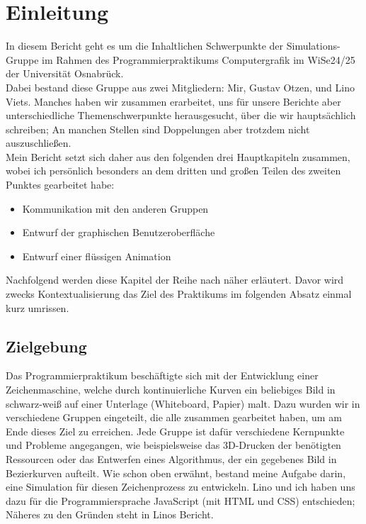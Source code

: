 \section{Einleitung}
\label{src:einleitung}
In diesem Bericht geht es um die Inhaltlichen Schwerpunkte der \glqq{}Simulations-Gruppe\grqq{} im Rahmen des Programmierpraktikums Computergrafik im WiSe24/25 der Universität Osnabrück. \\
Dabei bestand diese Gruppe aus zwei Mitgliedern: Mir, Gustav Otzen, und Lino Viets. Manches haben wir zusammen erarbeitet, uns für unsere Berichte aber unterschiedliche Themenschwerpunkte herausgesucht, über die wir hauptsächlich schreiben; An manchen Stellen sind Doppelungen aber trotzdem nicht auszuschließen. \\
Mein Bericht setzt sich daher aus den folgenden drei Hauptkapiteln zusammen, wobei ich persönlich besonders an dem dritten und großen Teilen des zweiten Punktes gearbeitet habe:

\begin{itemize}
\item Kommunikation mit den anderen Gruppen
\item Entwurf der graphischen Benutzeroberfläche
\item Entwurf einer flüssigen Animation
\end{itemize}

Nachfolgend werden diese Kapitel der Reihe nach näher erläutert. Davor wird zwecks Kontextualisierung das Ziel des Praktikums im folgenden Absatz einmal kurz umrissen.

\subsection{Zielgebung}
Das Programmierpraktikum beschäftigte sich mit der Entwicklung einer Zeichenmaschine, welche durch kontinuierliche Kurven ein beliebiges Bild in schwarz-weiß auf einer Unterlage (Whiteboard, Papier) malt. Dazu wurden wir in verschiedene Gruppen eingeteilt, die alle zusammen gearbeitet haben, um am Ende dieses Ziel  zu erreichen. Jede Gruppe ist dafür verschiedene Kernpunkte und Probleme angegangen, wie beispielsweise das 3D-Drucken der benötigten Ressourcen oder das Entwerfen eines Algorithmus, der ein gegebenes Bild in Bezierkurven aufteilt. Wie schon oben erwähnt, bestand meine Aufgabe darin, eine Simulation für diesen Zeichenprozess zu  entwickeln. Lino und ich haben uns dazu für die Programmiersprache JavaScript (mit HTML und CSS) entschieden; Näheres zu den Gründen steht in Linos Bericht.
